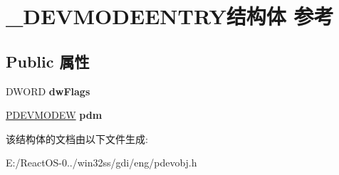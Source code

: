 \hypertarget{struct___d_e_v_m_o_d_e_e_n_t_r_y}{}\section{\+\_\+\+D\+E\+V\+M\+O\+D\+E\+E\+N\+T\+R\+Y结构体 参考}
\label{struct___d_e_v_m_o_d_e_e_n_t_r_y}
\subsection*{Public 属性}
\begin{DoxyCompactItemize}
\item 
\mbox{\label{struct___d_e_v_m_o_d_e_e_n_t_r_y_ac33ec2948aaab1a5d99824004f7b547d}} 
D\+W\+O\+RD {\bfseries dw\+Flags}
\item 
\mbox{\label{struct___d_e_v_m_o_d_e_e_n_t_r_y_a915b8c6656340ecf8c52257952e1bc91}} 
\hyperlink{struct__devicemode_w}{P\+D\+E\+V\+M\+O\+D\+EW} {\bfseries pdm}
\end{DoxyCompactItemize}


该结构体的文档由以下文件生成\+:\begin{DoxyCompactItemize}
\item 
E\+:/\+React\+O\+S-\/0../win32ss/gdi/eng/pdevobj.\+h\end{DoxyCompactItemize}

